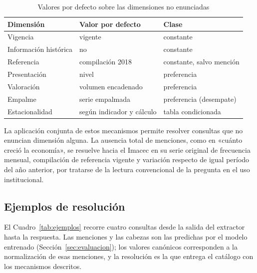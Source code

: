 \documentclass[11pt]{article}
\begin{document}
\begin{table}[htbp]
\centering
\caption{Valores por defecto sobre las dimensiones no enunciadas}
\label{tab:defaults}
\begin{tabular}{lll}
\toprule
Dimensión & Valor por defecto & Clase \\
\midrule
Vigencia               & vigente                        & constante \\
Información histórica  & no                             & constante \\
Referencia             & compilación 2018               & constante, salvo mención \\
Presentación           & nivel                          & preferencia \\
Valoración             & volumen encadenado             & preferencia \\
Empalme                & serie empalmada                & preferencia (desempate) \\
Estacionalidad         & según indicador y cálculo      & tabla condicionada \\
\bottomrule
\end{tabular}
\end{table}

La aplicación conjunta de estos mecanismos permite resolver consultas que no
enuncian dimensión alguna. La ausencia total de menciones, como en «cuánto creció
la economía», se resuelve hacia el Imacec en su serie original de frecuencia
mensual, compilación de referencia vigente y variación respecto de igual período
del año anterior, por tratarse de la lectura convencional de la pregunta en el
uso institucional.

\subsection{Ejemplos de resolución}
\label{sec:ejemplos}

El Cuadro~\ref{tab:ejemplos} recorre cuatro consultas desde la salida del
extractor hasta la respuesta. Las menciones y las cabezas son las predichas por
el modelo entrenado (Sección~\ref{sec:evaluacion}); los valores canónicos
corresponden a la normalización de esas menciones, y la resolución es la que
entrega el catálogo con los mecanismos descritos.
\end{document}
